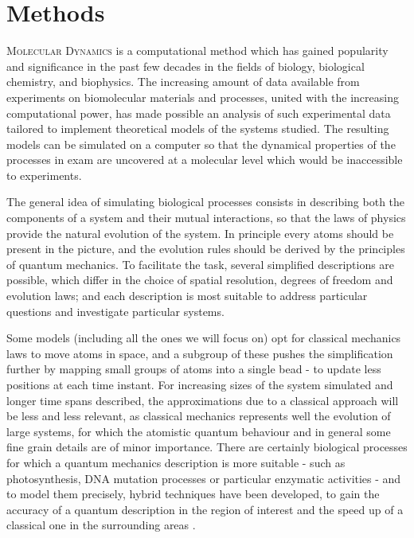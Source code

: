 \chapter{Methods} \label{chapter:MD}

\lettrine{M}{olecular Dynamics} is a computational method which has gained popularity and significance in the past few decades in the fields of biology, biological chemistry, and biophysics.
%
The increasing amount of data available from experiments on biomolecular materials and processes, united with the increasing computational power, has made possible an analysis of such experimental data tailored to implement theoretical models of the systems studied.
%
The resulting models can be simulated on a computer so that the dynamical properties of the processes in exam are uncovered at a molecular level which would be inaccessible to experiments.

The general idea of simulating biological processes consists in describing both the components of a system and their mutual interactions, so that the laws of physics provide the natural evolution of the system. In principle every atoms should be present in the picture, and the evolution rules should be derived by the principles of quantum mechanics.
%
To facilitate the task, several simplified descriptions are possible, which differ in the choice of spatial resolution, degrees of freedom and evolution laws; and each description is most suitable to address particular questions and investigate particular systems.

Some models (including all the ones we will focus on) opt for classical mechanics laws to move atoms in space, and a subgroup of these pushes the simplification further by mapping small groups of atoms into a single bead - to update less positions at each time instant.
%
For increasing sizes of the system simulated and longer time spans described, the approximations due to a classical approach will be less and less relevant, as classical mechanics represents well the evolution of large systems, for which the atomistic quantum behaviour and in general some fine grain details are of minor importance.
%
There are certainly biological processes for which a quantum mechanics description is more suitable - such as photosynthesis, DNA mutation processes or particular enzymatic activities - and to model them precisely, hybrid techniques have been developed, to gain the accuracy of a quantum description in the region of interest and the speed up of a classical one in the surrounding areas \cite{Warshel1976}.

